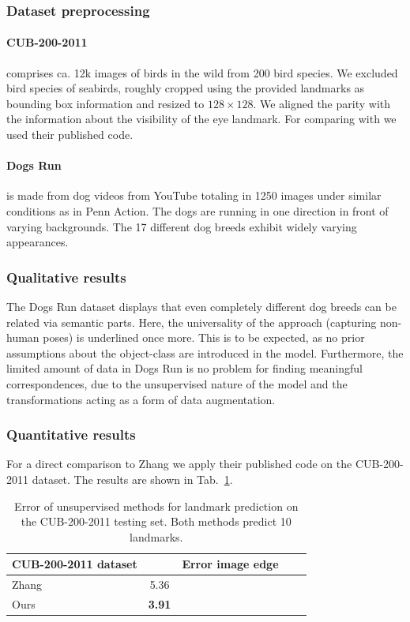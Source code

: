 		\subsubsection{Dataset preprocessing}
			\paragraph{CUB-200-2011} \cite{wah11birds} comprises ca. 12k images of birds in the wild from 200 bird species.
			We excluded bird species of seabirds, roughly cropped using the provided landmarks as bounding box information and resized to $128\times128$.
			We aligned the parity with the information about the visibility of the eye landmark.
			For comparing with \cite{zhang18} we used their published code.

			\paragraph{Dogs Run} is made from dog videos from YouTube totaling in 1250 images under similar conditions as in Penn Action. The dogs are running in one direction in front of varying backgrounds. The 17 different dog breeds exhibit widely varying appearances.

		\subsubsection{Qualitative results}
			The Dogs Run dataset displays that even completely different dog breeds can be related via semantic parts.
			Here, the universality of the approach (capturing non-human poses) is underlined once more.
			This is to be expected, as no prior assumptions about the object-class are introduced in the model.
			Furthermore, the limited amount of data in Dogs Run is no problem for finding meaningful correspondences, due to the unsupervised nature of the model and the transformations acting as a form of data augmentation.

		\subsubsection{Quantitative results}

			For a direct comparison to Zhang \etal \cite{zhang18} we apply their published code on the CUB-200-2011 dataset. The results are shown in Tab.~\ref{tab:birds}.

			\begin{table}[t]
				\caption{Error of unsupervised methods for landmark prediction on the CUB-200-2011 testing set. Both methods predict 10 landmarks.}
				\label{tab:birds}
				\centering
				\begin{tabular}{l|cccc}
					\hline
					CUB-200-2011 dataset&  & Error \wrt image edge\\
					\hline
					Zhang \cite{zhang18} & 5.36 \\
					Ours  & \textbf{3.91}  \\ \hline
				\end{tabular}
			\end{table}


